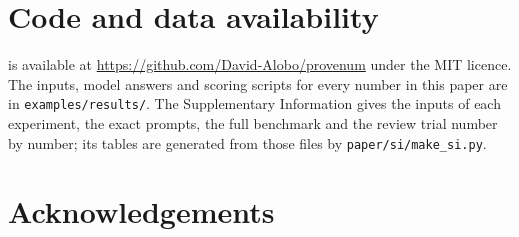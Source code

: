 \section*{Code and data availability}

\pv{} is available at \url{https://github.com/David-Alobo/provenum} under the MIT licence. The
inputs, model answers and scoring scripts for every number in this paper are in
\texttt{examples/results/}. The Supplementary Information gives the inputs of each experiment,
the exact prompts, the full benchmark and the review trial number by number; its tables are
generated from those files by \texttt{paper/si/make\_si.py}. 

\section*{Acknowledgements}

